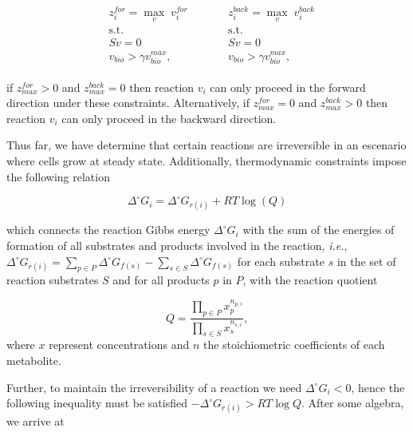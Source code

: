 \documentclass[12pt]{article}
\begin{document}
  \begin{align}
    \label{eq:2}
    \begin{aligned}
      &z^{for}_i=\max_{v}\; v^{for}_i
      \\
      &\mathrm{s.t.}
      \\
      & Sv = 0
      \\
      & v_{bio} > \gamma v^{max}_{bio},
    \end{aligned}
    \qquad
    \begin{aligned}
      &z^{back}_i=\max_{v}\; v^{back}_i
      \\
      &\mathrm{s.t.}
      \\
      & Sv = 0
      \\
      & v_{bio} > \gamma v^{max}_{bio},
    \end{aligned}
  \end{align}

  if $z^{for}_{max} > 0$ and $z^{back}_{max} = 0$ then reaction $v_i$ can only proceed in the forward direction under these constraints. Alternatively, if $z^{for}_{max} = 0$ and $z^{back}_{max} > 0$ then reaction $v_i$ can only proceed in the backward direction.

  Thus far, we have determine that certain reactions are irreversible in an escenario where cells grow at steady state. Additionally, thermodynamic constraints impose the following relation

  \begin{equation}
    \label{eq:3}
    \Delta^{\circ} G_i = \Delta^{\circ} G_{r(i)} + RT\log{\left( Q \right)}
  \end{equation}

  which connects the reaction Gibbs energy $\Delta^{\circ} G_i$ with the sum of the energies of formation of all substrates and products involved in the reaction, \emph{i.e.}, $\Delta^{\circ} G_{r(i)} = \sum_{p \in P} \Delta^{\circ} G_{f(s)} - \sum_{s \in S} \Delta^{\circ} G_{f(s)}$ for each substrate $s$ in the set of reaction substrates $S$ and for all products $p$ in $P$, with the reaction quotient

  $$Q = \frac{\displaystyle \prod_{p \in P}{x_p^{n_{p,i}} }}{\displaystyle \prod_{s \in S}{x_s^{n_{s,i}} } },$$ where $x$ represent concentrations and $n$ the stoichiometric coefficients of each metabolite.

  Further, to maintain the irreversibility of a reaction we need $\Delta^{\circ} G_i < 0$, hence the following inequality must be satisfied $-\Delta^{\circ} G_{r(i)} > RT\log{Q}$. After some algebra, we arrive at
\end{document}
